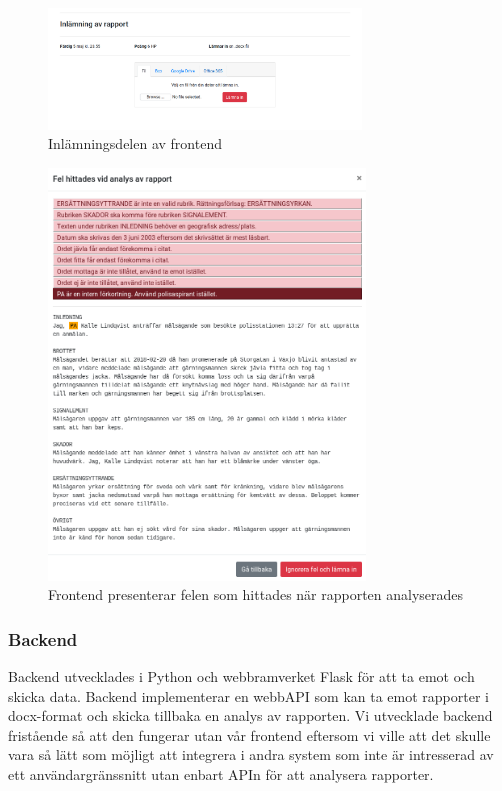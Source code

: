 \documentclass[swedish]{maucsthesis}
\begin{document}
\begin{figure}[H]
    \centering
    \includegraphics[width=0.74\textwidth]{frontendstart.png}
    \caption{Inlämningsdelen av frontend}
    \label{fig:frontendstart}
\end{figure}

\begin{figure}[H]
    \centering
    \includegraphics[width=0.75\textwidth]{frontenderrors.png}
    \caption{Frontend presenterar felen som hittades när rapporten analyserades}
    \label{fig:frontenderrors}
\end{figure}

\subsubsection{Backend}

Backend utvecklades i Python och webbramverket Flask för att ta emot och skicka
data. Backend implementerar en webbAPI som kan ta emot rapporter i docx-format
och skicka tillbaka en analys av rapporten. Vi utvecklade backend
fristående så att den fungerar utan vår frontend eftersom vi ville att det
skulle vara så lätt som möjligt att integrera i andra system som inte är
intresserad av ett användargränssnitt utan enbart APIn för att analysera
rapporter.
\end{document}
